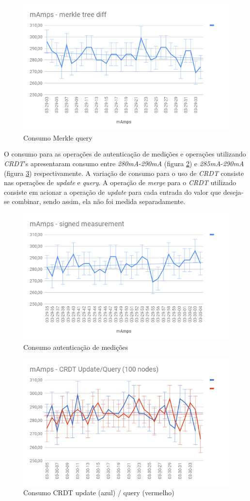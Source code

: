 \documentclass[12pt]{article}
\begin{document}
\begin{figure}[ht]
\centering
\includegraphics[width=.5\textwidth]{mAmps-merkle-diff.png}
\caption{Consumo Merkle query}
\label{fig:mamps_merkle_q}
\end{figure}

O consumo para as operações de autenticação de medições e operações utilizando {\it CRDT}'s apresentaram consumo entre {\it 280mA}-{\it 290mA} (figura \ref{fig:mamps_mac}) e {\it 285mA}-{\it 290mA} (figura \ref{fig:mamps_crdt}) respectivamente. A variação de consumo para o uso de {\it CRDT} consiste nas operações de {\it update} e {\it query}. A operação de {\it merge} para o {\it CRDT} utilizado consiste em acionar a operação de {\it update} para cada entrada do valor que deseja-se combinar, sendo assim, ela não foi medida separadamente.

\begin{figure}[ht]
\centering
\includegraphics[width=.5\textwidth]{mAmps-mac.png}
\caption{Consumo autenticação de medições}
\label{fig:mamps_mac}
\end{figure}

\begin{figure}[ht]
\centering
\includegraphics[width=.5\textwidth]{mAmps-crdt.png}
\caption{Consumo CRDT update (azul) / query (vermelho)}
\label{fig:mamps_crdt}
\end{figure}
\end{document}
